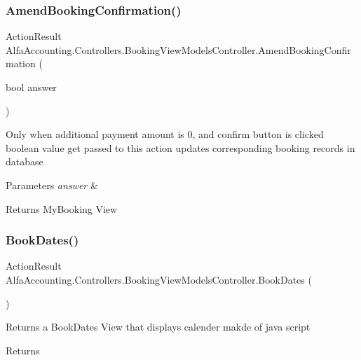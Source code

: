 \subsubsection{\texorpdfstring{Amend\+Booking\+Confirmation()}{AmendBookingConfirmation()}\hspace{0.1cm}{\footnotesize\ttfamily [2/2]}}
{\footnotesize\ttfamily Action\+Result Alfa\+Accounting.\+Controllers.\+Booking\+View\+Models\+Controller.\+Amend\+Booking\+Confirmation (\begin{DoxyParamCaption}\item[{bool}]{answer }\end{DoxyParamCaption})}



Only when additional payment amount is 0, and confirm button is clicked boolean value get passed to this action updates corresponding booking records in database 


\begin{DoxyParams}{Parameters}
{\em answer} & \\
\hline
\end{DoxyParams}
\begin{DoxyReturn}{Returns}
My\+Booking View
\end{DoxyReturn}
\mbox{\label{class_alfa_accounting_1_1_controllers_1_1_booking_view_models_controller_a1fa97ecedb9b4faaec9e994bfce18eb3}} 
\subsubsection{\texorpdfstring{Book\+Dates()}{BookDates()}}
{\footnotesize\ttfamily Action\+Result Alfa\+Accounting.\+Controllers.\+Booking\+View\+Models\+Controller.\+Book\+Dates (\begin{DoxyParamCaption}{ }\end{DoxyParamCaption})}



Returns a Book\+Dates View that displays calender makde of java script 

\begin{DoxyReturn}{Returns}

\end{DoxyReturn}
\mbox{\label{class_alfa_accounting_1_1_controllers_1_1_booking_view_models_controller_a34296cd23c09ae737da8519afeb608ab}} 

